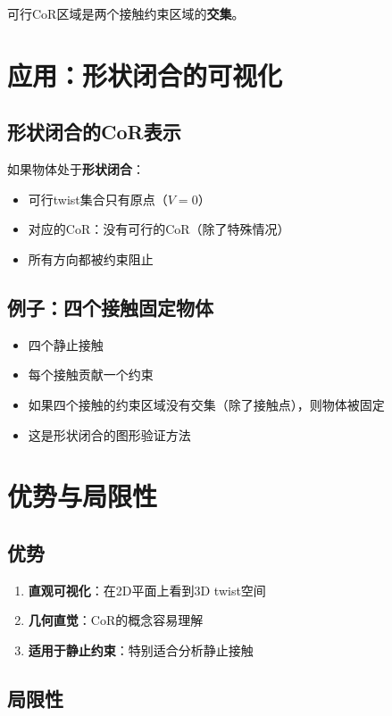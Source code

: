 \documentclass[12pt,a4paper]{article}
\begin{document}
可行CoR区域是两个接触约束区域的\textbf{交集}。

\section{应用：形状闭合的可视化}

\subsection{形状闭合的CoR表示}

如果物体处于\textbf{形状闭合}：
\begin{itemize}
\item 可行twist集合只有原点（$V = 0$）
\item 对应的CoR：没有可行的CoR（除了特殊情况）
\item 所有方向都被约束阻止
\end{itemize}

\subsection{例子：四个接触固定物体}

\begin{itemize}
\item 四个静止接触
\item 每个接触贡献一个约束
\item 如果四个接触的约束区域没有交集（除了接触点），则物体被固定
\item 这是形状闭合的图形验证方法
\end{itemize}

\section{优势与局限性}

\subsection{优势}

\begin{enumerate}
\item \textbf{直观可视化}：在2D平面上看到3D twist空间
\item \textbf{几何直觉}：CoR的概念容易理解
\item \textbf{适用于静止约束}：特别适合分析静止接触
\end{enumerate}

\subsection{局限性}
\end{document}
